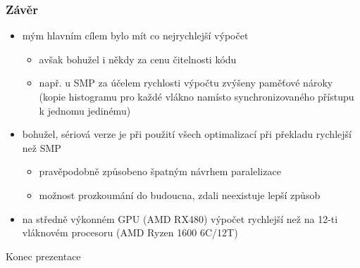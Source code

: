 \documentclass[xcolor=dvipsnames]{beamer}
\begin{document}
\begin{frame}
\frametitle{Závěr}
    \begin{itemize}
        \item mým hlavním cílem bylo mít co nejrychlejší výpočet
            \begin{itemize}
                \item avšak bohužel i někdy za cenu čitelnosti kódu
                \item např. u SMP za účelem rychlosti výpočtu zvýšeny paměťové nároky (kopie histogramu pro každé vlákno namísto synchronizovaného přístupu k jednomu jedinému)
            \end{itemize}
        \item bohužel, sériová verze je při použití všech optimalizací při překladu rychlejší než SMP
        \begin{itemize}    
            \item pravěpodobně způsobeno špatným návrhem paralelizace
            \item možnost prozkoumání do budoucna, zdali neexistuje lepší způsob
        \end{itemize}    
    \item na středně výkonném GPU (AMD RX480) výpočet rychlejší než na 12-ti vláknovém procesoru (AMD Ryzen 1600 6C/12T)
    \end{itemize}
\end{frame}

\begin{frame}
\center
Konec prezentace
\end{frame}
\end{document}
